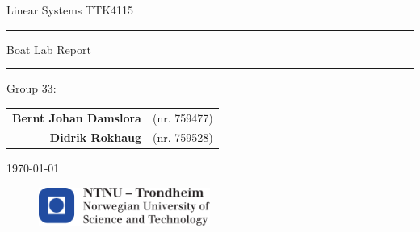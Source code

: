 
\begin{titlepage}
    \begin{center}
    	\large
    	Linear Systems TTK4115
    \end{center}
    \vspace{\fill}
    \rule{\linewidth}{0.5mm}
    \begin{center}
    	\huge
    	Boat Lab Report
    \end{center}
	\rule{\linewidth}{0.5mm}
	\vspace{\fill}

    \large
    \centering
    Group 33:
    \begin{table}[H]
    	\centering
    	\large
    	\begin{tabular}{rl}
    		\textbf{Bernt Johan Damslora} & (nr. 759477) \\
    		\textbf{Didrik Rokhaug} &  (nr. 759528)

    	\end{tabular}
    \end{table}
    \vspace{\fill}
    \begin{center}
    	\large
    	\today
    \end{center}
	\vspace{\fill}
    \begin{figure}[H]
    \centering
    \includegraphics[width=0.5\textwidth]{images/logontnu_eng}
    \end{figure}
    \thispagestyle{empty}
\end{titlepage}
